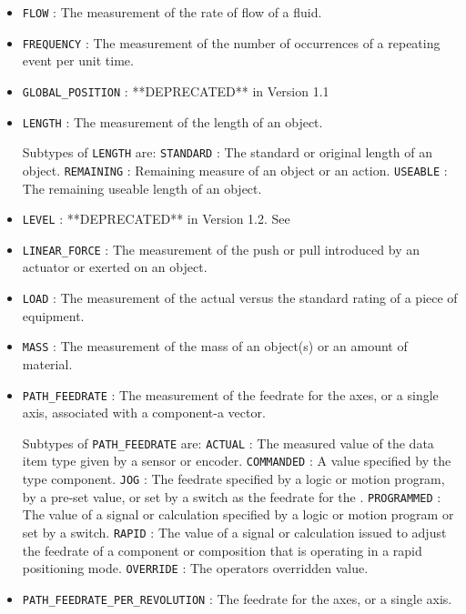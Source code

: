 \begin{itemize}
\item \texttt{FLOW} : The measurement of the rate of flow of a fluid. 

\item \texttt{FREQUENCY} : The measurement of the number of occurrences of a repeating event per unit time. 

\item \texttt{GLOBAL_POSITION} : **DEPRECATED** in Version 1.1 

\item \texttt{LENGTH} : The measurement of the length of an object. 

Subtypes of \texttt{LENGTH} are: 
\newline\tab \texttt{STANDARD} : The standard or original length of an object. 
\newline\tab \texttt{REMAINING} : Remaining measure of an object or an action. 
\newline\tab \texttt{USEABLE} : The remaining useable length of an object. 
\item \texttt{LEVEL} : **DEPRECATED** in Version 1.2.  See  

\item \texttt{LINEAR_FORCE} : The measurement of the push or pull introduced by an actuator or exerted on an object. 

\item \texttt{LOAD} : The measurement of the actual versus the standard rating of a piece of equipment. 

\item \texttt{MASS} : The measurement of the mass of an object(s) or an amount of material. 

\item \texttt{PATH_FEEDRATE} : The measurement of the feedrate for the axes, or a single axis, associated with a  component-a vector. 

Subtypes of \texttt{PATH_FEEDRATE} are: 
\newline\tab \texttt{ACTUAL} : The measured value of the data item type given by a sensor or encoder. 
\newline\tab \texttt{COMMANDED} : A value specified by the  type component. 
\newline\tab \texttt{JOG} : The feedrate specified by a logic or motion program, by a pre-set value, or set by a switch as the feedrate for the .  
\newline\tab \texttt{PROGRAMMED} : The value of a signal or calculation specified by a logic or motion program or set by a switch. 
\newline\tab \texttt{RAPID} : The value of a signal or calculation issued to adjust the feedrate of a component or composition that is operating in a rapid positioning mode. 
\newline\tab \texttt{OVERRIDE} : The operators overridden value. 
\item \texttt{PATH_FEEDRATE_PER_REVOLUTION} : The feedrate for the axes, or a single axis. 


\end{itemize}
